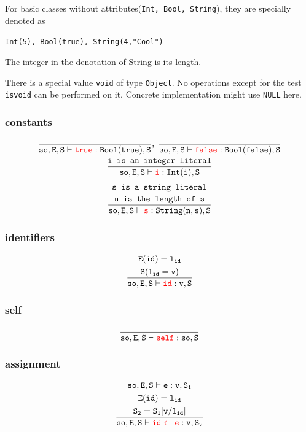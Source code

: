 For basic classes without attributes(\texttt{Int, Bool, String}), they are specially denoted as
\begin{center}
\texttt{Int(5), Bool(true), String(4,"Cool")}
\end{center}
The integer in the denotation of String is its length.

There is a special value \texttt{void} of type \texttt{Object}. No operations except for the test \texttt{isvoid} can be performed on it. Concrete implementation might use \texttt{NULL} here.
\subsubsection{constants}
\begin{gather*}
\mathtt{\frac{}{so,E,S\vdash {\color{red}true}:Bool(true),S}},\;\mathtt{\frac{}{so,E,S\vdash {\color{red}false}:Bool(false),S}}\\
\mathtt{\frac{\texttt{i is an integer literal}}{so,E,S\vdash {\color{red}i}:Int(i),S}}\\
\end{gather*}
\begin{gather*}
\texttt{s is a string literal}\\
\mathtt{\frac{\texttt{n is the length of s}}{so,E,S\vdash {\color{red}s}:String(n,s),S}}\\
\end{gather*}
\subsubsection{identifiers}
\begin{gather*}
\mathtt{E(id)=l_{id}}\\
\mathtt{\frac{S(l_{id}=v)}{so,E,S\vdash {\color{red}id}:v,S}}\\
\end{gather*}
\subsubsection{self}
\begin{equation*}
\mathtt{\frac{}{so,E,S\vdash {\color{red}self}:so,S}}
\end{equation*}
\subsubsection{assignment}
\begin{gather*}\tt
\mathtt{so,E,S\vdash e:v,S_1}\\
\mathtt{E(id) = l_{id}}\\
\mathtt{\frac{S_2=S_1[v/l_{id}]}{so,E,S\vdash {\color{red}id\leftarrow e}:v,S_2}}
\end{gather*}
